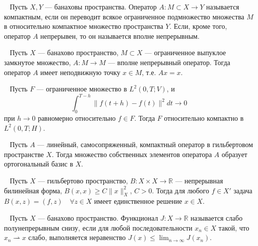 \begin{definition}
    \label{def:compact_operator}~\cite[с.~190]{Lusternik1982}
    Пусть $X, Y$ — банаховы пространства.
    Оператор $A : M \subset X \to Y$ называется компактным,
    если он переводит всякое ограниченное подмножество множества
    $M$ в относительно компактное множество пространства $Y$.
    Если, кроме того, оператор $A$ непрерывен,
    то он называется вполне непрерывным.
\end{definition}

\begin{theorem}
    \label{thm:schauder}~\cite[с.~193]{Lusternik1982}
    Пусть $X$ — банахово пространство, $M \subset X$ — ограниченное выпуклое
    замкнутое множество, $A : M \to M$ — вполне непрерывный оператор.
    Тогда оператор $A$ имеет неподвижную точку $x \in M$, т.е. $Ax = x$.
\end{theorem}


\begin{theorem}
    \label{thm:compactness}~\cite[теорема 3]{Simon1986}
    Пусть $F$ — ограниченное множество в $L^2(0, T; V)$, и
    \[
        \int_0^{T-h} \|f(t+h) - f(t)\|^2 dt \to 0
    \]
    при $h \to 0$ равномерно относительно $f \in F$.
    Тогда $F$ относительно компактно в $L^2(0, T; H)$.
\end{theorem}

\begin{theorem}
    \label{thm:hilbert-schmidt}~\cite[с. 263]{Kolmogorov2004}
    Пусть $A$ — линейный, самосопряженный, компактный оператор
    в гильбертовом пространстве $X$.
    Тогда множество собственных элементов оператора $A$ образует
    ортогональный базис в $X$.
\end{theorem}

\begin{theorem}
    \label{thm:lax-milgram}~\cite[с. 40]{Oben1977}
    Пусть $X$ — гильбертово пространство,
    $B : X \times X \to \mathbb{R}$ — непрерывная билинейная форма,
    $B(x, x) \geq C\|x\|^2_X$, $C > 0$.
    Тогда для любого $f \in X'$ задача
    $B(x, z) = (f, z) \quad \forall z \in X$
    имеет единственное решение $x \in X$.
\end{theorem}

\begin{definition}
    \label{def:weakly_semicontinuous}~\cite[с. 47]{Troeltzsch2010}
    Пусть $X$ — банахово пространство.
    Функционал $J : X \to \mathbb{R}$ называется слабо полунепрерывным
    снизу, если для любой последовательности $x_n \in X$ такой,
    что $x_n \rightharpoonup x$ слабо, выполняется неравенство
    $J(x) \leq \lim_{n \to \infty} J(x_n)$.
\end{definition}

